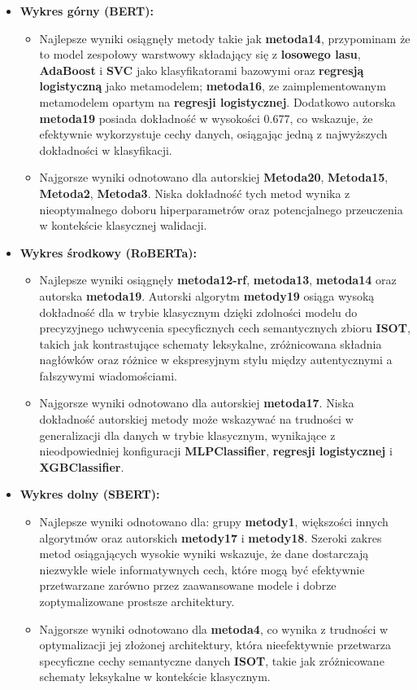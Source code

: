 \begin{itemize}
	\item \textbf{Wykres górny (BERT):}
	      \begin{itemize}
		      \item Najlepsze wyniki osiągnęły metody takie jak \textbf{metoda14}, przypominam że to model zespołowy warstwowy składający się z \textbf{losowego lasu}, \textbf{AdaBoost} i \textbf{SVC} jako klasyfikatorami bazowymi oraz \textbf{regresją logistyczną} jako meta\-modelem; \textbf{metoda16}, ze zaimplementowanym meta\-modelem opartym na \textbf{regresji logistycznej}. Dodatkowo autorska \textbf{metoda19} posiada dokładność w wysokości 0.677, co wskazuje, że efektywnie wykorzystuje cechy danych, osiągając jedną z najwyższych dokładności w klasyfikacji.
		      \item Najgorsze wyniki odnotowano dla autorskiej \textbf{Metoda20}, \textbf{Metoda15}, \textbf{Metoda2}, \textbf{Metoda3}. Niska dokładność tych metod wynika z nieoptymalnego doboru hiperparametrów oraz potencjalnego przeuczenia w kontekście klasycznej walidacji.
	      \end{itemize}

	\item \textbf{Wykres środkowy (RoBERTa):}
	      \begin{itemize}
		      \item Najlepsze wyniki osiągnęły \textbf{metoda12-rf}, \textbf{metoda13}, \textbf{metoda14} oraz autorska \textbf{metoda19}. Autorski algorytm \textbf{metody19} osiąga wysoką dokładność dla w trybie klasycznym dzięki zdolności modelu do precyzyjnego uchwycenia specyficznych cech semantycznych zbioru \textbf{ISOT}, takich jak kontrastujące schematy leksykalne, zróżnicowana składnia nagłówków oraz różnice w ekspresyjnym stylu między autentycznymi a fałszywymi wiadomościami.
		      \item Najgorsze wyniki odnotowano dla autorskiej \textbf{metoda17}. Niska dokładność autorskiej metody może wskazywać na trudności w generalizacji dla danych w trybie klasycznym, wynikające z nieodpowiedniej konfiguracji \textbf{MLPClassifier}, \textbf{regresji logistycznej} i \textbf{XGBClassifier}.
	      \end{itemize}

	\item \textbf{Wykres dolny (SBERT):}
	      \begin{itemize}
		      \item Najlepsze wyniki odnotowano dla: grupy \textbf{metody1}, większości innych algorytmów oraz autorskich \textbf{metody17} i \textbf{metody18}. Szeroki zakres metod osiągających wysokie wyniki wskazuje, że dane dostarczają niezwykle wiele informatywnych cech, które mogą być efektywnie przetwarzane zarówno przez zaawansowane modele i dobrze zoptymalizowane prostsze architektury.
		      \item Najgorsze wyniki odnotowano dla \textbf{metoda4}, co wynika z trudności w optymalizacji jej złożonej architektury, która nieefektywnie przetwarza specyficzne cechy semantyczne danych \textbf{ISOT}, takie jak zróżnicowane schematy leksykalne  w kontekście klasycznym.
	      \end{itemize}
\end{itemize}

